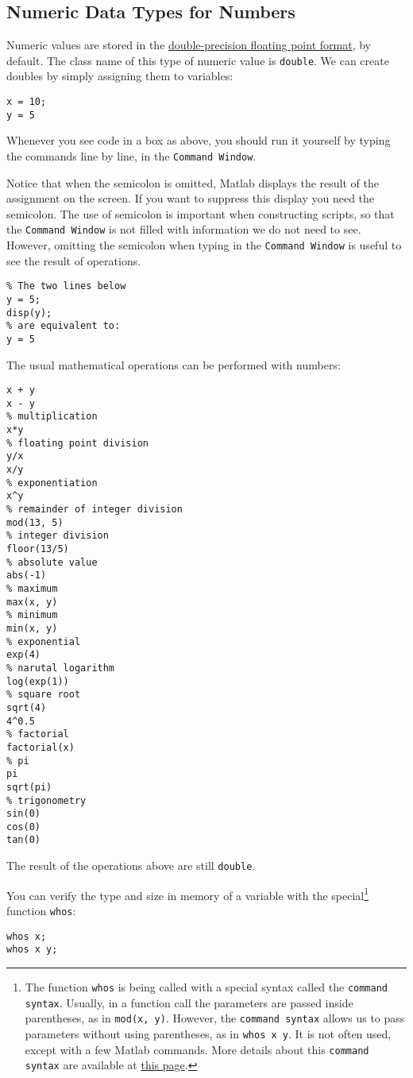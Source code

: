 \documentclass[12pt, a4paper]{article}
\begin{document}
\subsection{Numeric Data Types for Numbers}
\label{sec:orga091203}
Numeric values are stored in the \href{https://en.wikipedia.org/wiki/Double-precision\_floating-point\_format}{double-precision floating point format}, by default.
The class name of this type of numeric value is \texttt{double}.
We can create doubles by simply assigning them to variables:
\lstset{language=matlab,label= ,caption= ,captionpos=b,firstnumber=1,numbers=left,style=Matlab-editor}
\begin{lstlisting}
x = 10;
y = 5
\end{lstlisting}
Whenever you see code in a box as above, you should run it yourself by typing the commands line by line, in the \texttt{Command Window}.

Notice that when the semicolon is omitted, Matlab displays the result of the assignment on the screen.
If you want to suppress this display you need the semicolon.
The use of semicolon is important when constructing scripts, so that the \texttt{Command Window} is not filled with information we do not need to see.
However, omitting the semicolon when typing in the \texttt{Command Window} is useful to see the result of operations.
\lstset{language=matlab,label= ,caption= ,captionpos=b,firstnumber=1,numbers=left,style=Matlab-editor}
\begin{lstlisting}
% The two lines below
y = 5;
disp(y);
% are equivalent to:
y = 5
\end{lstlisting}

The usual mathematical operations can be performed with numbers:
\lstset{language=matlab,label= ,caption= ,captionpos=b,firstnumber=1,numbers=left,style=Matlab-editor}
\begin{lstlisting}
x + y
x - y
% multiplication
x*y
% floating point division
y/x
x/y
% exponentiation
x^y
% remainder of integer division
mod(13, 5)
% integer division
floor(13/5)
% absolute value
abs(-1)
% maximum
max(x, y)
% minimum
min(x, y)
% exponential
exp(4)
% narutal logarithm
log(exp(1))
% square root
sqrt(4)
4^0.5
% factorial
factorial(x)
% pi
pi
sqrt(pi)
% trigonometry
sin(0)
cos(0)
tan(0)
\end{lstlisting}
The result of the operations above are still \texttt{double}.

You can verify the type and size in memory of a variable with the special\footnote{The function \texttt{whos} is being called with a special syntax called the \texttt{command syntax}. Usually, in a function call the parameters are passed inside parentheses, as in \texttt{mod(x, y)}. However, the \texttt{command syntax} allows us to pass parameters without using parentheses, as in \texttt{whos x y}. It is not often used, except with a few Matlab commands. More details about this \texttt{command syntax} are available at \href{https://www.mathworks.com/help/matlab/matlab\_prog/command-vs-function-syntax.html}{this page}.} function \texttt{whos}:
\lstset{language=matlab,label= ,caption= ,captionpos=b,firstnumber=1,numbers=left,style=Matlab-editor}
\begin{lstlisting}
whos x;
whos x y;
\end{lstlisting}
\end{document}
